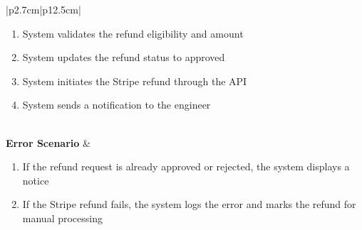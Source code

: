 \begin{table}[H]
\begin{tabular}{|p{2.7cm}|p{12.5cm}|}
\begin{minipage}[t]{\linewidth}
\begin{enumerate}[topsep=0pt,itemsep=1pt,parsep=0pt,partopsep=0pt]
                                          \item System validates the refund eligibility and amount
                                          \item System updates the refund status to approved
                                          \item System initiates the Stripe refund through the API
                                          \item System sends a notification to the engineer
                                      \end{enumerate}
                                  \end{minipage}               \\
        \hline
        \textbf{Error Scenario} & \begin{minipage}[t]{\linewidth}
                                      \begin{enumerate}[topsep=0pt,itemsep=1pt,parsep=0pt,partopsep=0pt]
                                          \item If the refund request is already approved or rejected, the system displays a
                                                notice
                                          \item If the Stripe refund fails, the system logs the error and marks the refund for
                                                manual processing
                                      \end{enumerate}
                                  \end{minipage} \\
        \hline
    \end{tabular}
    \label{tab:admin-approve-refund-request}
\end{table}
